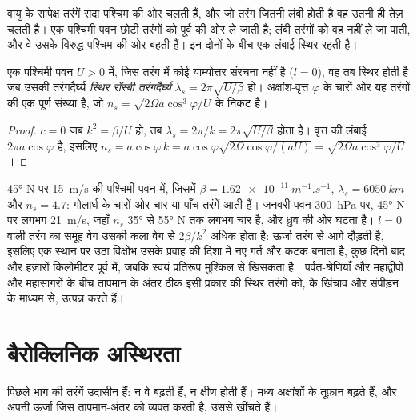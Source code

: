 वायु के सापेक्ष तरंगें सदा पश्चिम की ओर चलती हैं, और जो तरंग जितनी लंबी होती है
वह उतनी ही तेज़ चलती है। एक पश्चिमी पवन छोटी तरंगों को पूर्व की ओर ले जाती है; लंबी तरंगों को वह
नहीं ले जा पाती, और वे उसके विरुद्ध पश्चिम की ओर बहती हैं। इन दोनों के बीच
एक लंबाई स्थिर रहती है।

\begin{proposition}[स्थिर रॉस्बी तरंगें]\label{prop:b3:atmospheric-dynamics:stationary}
एक पश्चिमी पवन $U > 0$ में, जिस तरंग में कोई याम्योत्तर संरचना नहीं है ($l = 0$), वह
तब स्थिर होती है जब उसकी तरंगदैर्घ्य \emph{स्थिर रॉस्बी
तरंगदैर्घ्य} $\lambda_s =
2\pi\sqrt{U/\beta}$ हो। अक्षांश-वृत्त $\varphi$ के चारों ओर यह तरंगों की एक पूर्ण
संख्या है, जो $n_s = \sqrt{2\Omega a\cos^3\varphi/U}$ के निकट है।
\end{proposition}

\begin{proof}
$c = 0$ जब $k^2 = \beta/U$ हो, तब $\lambda_s = 2\pi/k = 2\pi\sqrt{U/\beta}$ होता है।
वृत्त की लंबाई $2\pi a\cos\varphi$ है, इसलिए $n_s = a\cos\varphi\,k =
a\cos\varphi\sqrt{2\Omega\cos\varphi/(aU)} = \sqrt{2\Omega a\cos^3\varphi/U}$।
\end{proof}

\ang{45} N पर \qty{15}{m/s} की पश्चिमी पवन में, जिसमें $\beta =
\qty{1.62e-11}{m^{-1}.s^{-1}}$, $\lambda_s = \qty{6050}{km}$ और $n_s =
4.7$: गोलार्ध के चारों ओर चार या पाँच तरंगें आती हैं। 
जनवरी पवन \qty{300}{hPa} पर, \ang{45} N पर लगभग \qty{21}{m/s}, जहाँ $n_s$
\ang{35} से \ang{55} N तक लगभग चार है, और ध्रुव की ओर घटता है।
$l = 0$ वाली तरंग का समूह वेग उसकी कला वेग से $2\beta/k^2$ अधिक होता है: ऊर्जा
तरंग से आगे दौड़ती है, इसलिए एक स्थान पर उठा विक्षोभ उसके प्रवाह की दिशा में नए गर्त
और कटक बनाता है, कुछ दिनों बाद और हज़ारों किलोमीटर पूर्व में, जबकि
स्वयं प्रतिरूप मुश्किल से खिसकता है। पर्वत-श्रेणियाँ और
महाद्वीपों और महासागरों के बीच तापमान के अंतर ठीक इसी प्रकार की स्थिर
तरंगों को,  के खिंचाव और संपीड़न के माध्यम से,
उत्पन्न करते हैं।


\section{बैरोक्लिनिक अस्थिरता}\label{sec:b3:atmospheric-dynamics:baroclinic}

पिछले भाग की तरंगें उदासीन हैं: न वे बढ़ती हैं, न क्षीण होती हैं।
मध्य अक्षांशों के तूफ़ान बढ़ते हैं, और अपनी ऊर्जा
 जिस तापमान-अंतर को व्यक्त करती है, उससे खींचते हैं।

